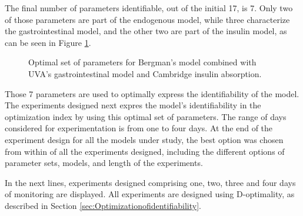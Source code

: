 The final number of parameters identifiable, out of the initial 17, is 7. Only two of those parameters are part of the endogenous model, while three characterize the gastrointestinal model, and the other two are part of the insulin model, as can be seen in Figure \ref{fig:bergmanparametersidentifiable}.

\begin{figure}[hbtp]
\centering
{}\caption{Optimal set of parameters for Bergman's model combined with UVA's gastrointestinal model and Cambridge insulin absorption.}
\label{fig:bergmanparametersidentifiable}
\end{figure}

Those 7 parameters are used to optimally express the identifiability of the model. The experiments designed next expres the model's identifiability in the optimization index by using this optimal set of parameters. The range of days considered for experimentation is from one to four days. At the end of the experiment design for all the models under study, the best option was chosen from within of all the experiments designed, including the different options of parameter sets, models, and length of the experiments.

In the next lines, experiments designed comprising one, two, three and four days of monitoring are displayed. All experiments are designed using D-optimality, as described in Section \ref{sec:Optimizationofidentifiability}.

